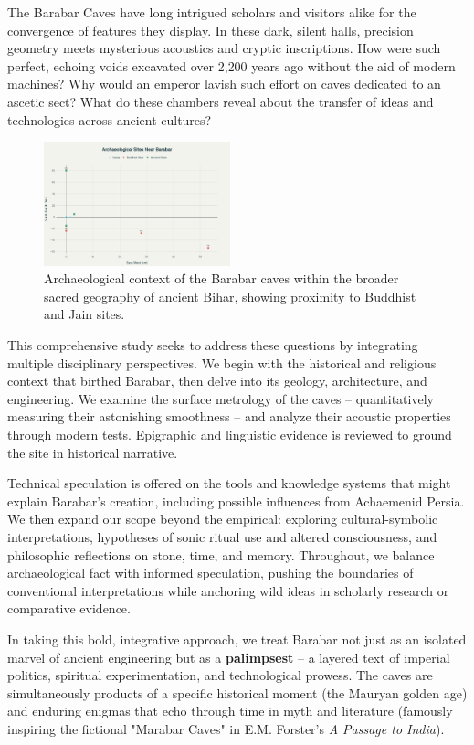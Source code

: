 \documentclass[11pt]{article}
\begin{document}
The Barabar Caves have long intrigued scholars and visitors alike for the convergence of features they display. In these dark, silent halls, precision geometry meets mysterious acoustics and cryptic inscriptions. How were such perfect, echoing voids excavated over 2,200 years ago without the aid of modern machines? Why would an emperor lavish such effort on caves dedicated to an ascetic sect? What do these chambers reveal about the transfer of ideas and technologies across ancient cultures?

\begin{figure}
\centering
\includegraphics[width=0.48\textwidth]{archaeological_sites_map.png}
\caption{Archaeological context of the Barabar caves within the broader sacred geography of ancient Bihar, showing proximity to Buddhist and Jain sites.}
\label{fig:sitemap}
\end{figure}

This comprehensive study seeks to address these questions by integrating multiple disciplinary perspectives. We begin with the historical and religious context that birthed Barabar, then delve into its geology, architecture, and engineering. We examine the surface metrology of the caves -- quantitatively measuring their astonishing smoothness -- and analyze their acoustic properties through modern tests. Epigraphic and linguistic evidence is reviewed to ground the site in historical narrative.

Technical speculation is offered on the tools and knowledge systems that might explain Barabar's creation, including possible influences from Achaemenid Persia. We then expand our scope beyond the empirical: exploring cultural-symbolic interpretations, hypotheses of sonic ritual use and altered consciousness, and philosophic reflections on stone, time, and memory. Throughout, we balance archaeological fact with informed speculation, pushing the boundaries of conventional interpretations while anchoring wild ideas in scholarly research or comparative evidence.

In taking this bold, integrative approach, we treat Barabar not just as an isolated marvel of ancient engineering but as a \textbf{palimpsest} -- a layered text of imperial politics, spiritual experimentation, and technological prowess. The caves are simultaneously products of a specific historical moment (the Mauryan golden age) and enduring enigmas that echo through time in myth and literature (famously inspiring the fictional "Marabar Caves" in E.M. Forster's \textit{A Passage to India}).
\end{document}
